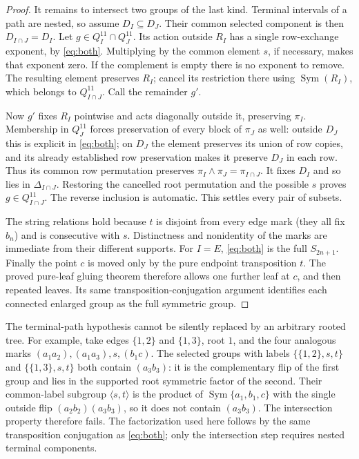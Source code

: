 \documentclass[a4paper,11pt]{article}
\newcommand{\Sym}{\operatorname{Sym}}
\newcommand{\gen}[1]{\langle #1\rangle}
\begin{document}
\begin{proof}
It remains to intersect two groups of the last kind. Terminal intervals of
a path are nested, so assume $D_I\subseteq D_J$. Their common selected
component is then $D_{I\cap J}=D_I$. Let
$g\in Q_I^{11}\cap Q_J^{11}$. Its action outside $R_I$ has a single
row-exchange exponent, by \eqref{eq:both}. Multiplying by the common element
$s$, if necessary, makes that exponent zero. If the complement is empty
there is no exponent to remove. The resulting element preserves $R_I$;
cancel its restriction there using $\Sym(R_I)$, which belongs to
$Q_{I\cap J}^{11}$. Call the remainder $g'$.

Now $g'$ fixes $R_I$ pointwise and acts diagonally outside it, preserving
$\pi_I$. Membership in $Q_J^{11}$ forces preservation of every block of
$\pi_J$ as well: outside $D_J$ this is explicit in \eqref{eq:both}; on
$D_J$ the element preserves its union of row copies, and its already
established row preservation makes it preserve $D_J$ in each row.
Thus its common row permutation preserves
$\pi_I\wedge\pi_J=\pi_{I\cap J}$. It fixes $D_I$ and so lies in
$\Delta_{I\cap J}$. Restoring the cancelled root permutation and the possible
$s$ proves $g\in Q_{I\cap J}^{11}$. The reverse inclusion is automatic.
This settles every pair of subsets.

The string relations hold because $t$ is disjoint from every edge mark
(they all fix $b_n$) and is consecutive with $s$. Distinctness and
nonidentity of the marks are immediate from their different supports.
For $I=E$, \eqref{eq:both} is the full $S_{2n+1}$.
Finally the point $c$ is moved only by the pure endpoint transposition $t$.
The proved pure-leaf gluing theorem therefore allows one further leaf at
$c$, and then repeated leaves. Its same transposition-conjugation argument
identifies each connected enlarged group as the full symmetric group.
\end{proof}

The terminal-path hypothesis cannot be silently replaced by an arbitrary
rooted tree. For example, take edges $\{1,2\}$ and $\{1,3\}$, root $1$,
and the four analogous marks $(a_1a_2),(a_1a_3),s,(b_1c)$.
The selected groups with labels $\{\{1,2\},s,t\}$ and
$\{\{1,3\},s,t\}$ both contain $(a_3b_3)$: it is the complementary
flip of the first group and lies in the supported root symmetric factor of
the second. Their common-label subgroup $\gen{s,t}$ is the product of
$\Sym\{a_1,b_1,c\}$ with the single outside flip
$(a_2b_2)(a_3b_3)$, so it does not contain $(a_3b_3)$.
The intersection property therefore fails. The factorization used here
follows by the same transposition conjugation as \eqref{eq:both}; only the
intersection step requires nested terminal components.
\end{document}
